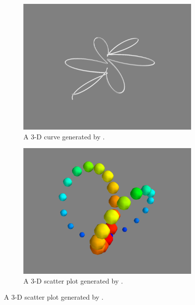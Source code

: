 \begin{figure} %
\captionsetup[subfigure]{justification=centering}
\centering
\begin{subfigure}{.5\textwidth}
    \centering
    \includegraphics[width=\linewidth]{plot3d.pdf}
    \caption{A 3-D curve generated by .}
    \label{fig:plot3d}
\end{subfigure}%
\begin{subfigure}{.5\textwidth}
    \centering
    \includegraphics[width=\linewidth]{points3d.pdf}
    \caption{A 3-D scatter plot generated by .}
    \label{fig:points3d}
\end{subfigure}
\end{figure}

